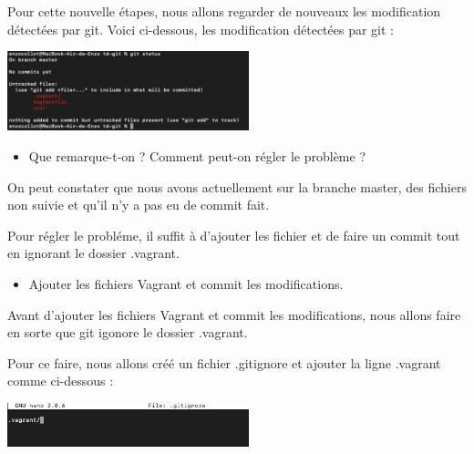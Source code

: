 \documentclass[12pt]{article}
\begin{document}
Pour cette nouvelle étapes, nous allons regarder de nouveaux les modification détectées par git. Voici ci-dessous, les modification détectées par git : 

\vspace{0.3cm}

\begin{center}
  \includegraphics[width=7cm]{Image-TD-Git-1/git-status-2.png}
\end{center}

\vspace{0.3cm}

\begin{itemize}
  \item Que remarque-t-on ? Comment peut-on régler le problème ?
\end{itemize}

On peut constater que nous avons actuellement sur la branche master, des fichiers non suivie et qu'il n'y a pas eu de commit fait. \newline

Pour régler le probléme, il suffit à d'ajouter les fichier et de faire un commit tout en ignorant le dossier .vagrant.

\vspace{0.3cm}

\begin{itemize}
  \item Ajouter les fichiers Vagrant et commit les modifications.
\end{itemize}

Avant d'ajouter les fichiers Vagrant et commit les modifications, nous allons faire en sorte que git igonore le dossier .vagrant. \newline

Pour ce faire, nous allons créé un fichier .gitignore et ajouter la ligne .vagrant comme ci-dessous : 

\vspace{0.3cm}

\begin{center}
  \includegraphics[width=7cm]{Image-TD-Git-1/gitignore.png}
\end{center}
\end{document}
